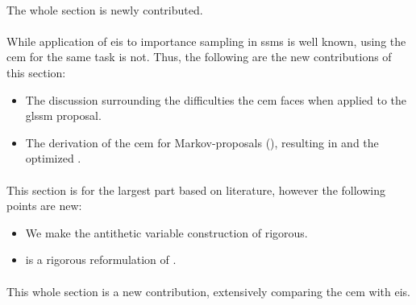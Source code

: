\begin{tcolorbox}[title={Contributions}]
    \paragraph{}
    The whole section is newly contributed.

    \paragraph{}
    While application of \gls{eis} to importance sampling in \glspl{ssm} is well known, using the \gls{cem} for the same task is not. Thus, the following are the new contributions of this section:
    \begin{itemize}
        \item The discussion surrounding the difficulties the \gls{cem} faces when applied to the \gls{glssm} proposal.
        \item The derivation of the \gls{cem} for Markov-proposals (), resulting in  and the optimized .
    \end{itemize}

    \paragraph{}
    This section is for the largest part based on literature, however the following points are new:
    \begin{itemize}
        \item We make the antithetic variable construction of \citep{Durbin1997Monte} rigorous. 
        \item {} is a rigorous reformulation of \citep[Section 11.5]{Durbin2012Time}.
    \end{itemize}

    \paragraph{} 
    This whole section is a new contribution, extensively comparing the \gls{cem} with \gls{eis}.
\end{tcolorbox}
\newpage
\glsresetall

